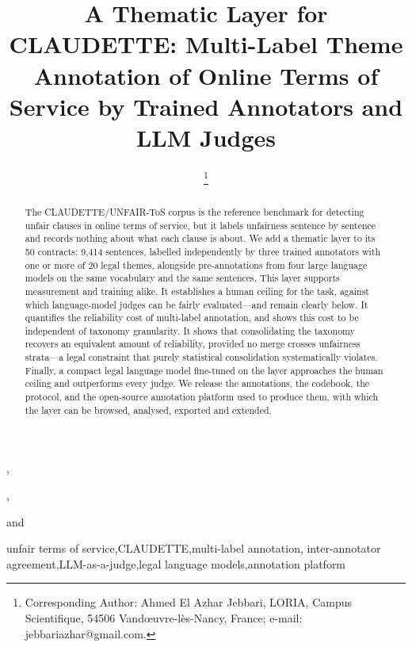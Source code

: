 \documentclass{IOS-Book-Article}
\newcommand{\corpus}{CLAUDETTE}
\begin{document}
\begin{frontmatter}
\title{A Thematic Layer for \corpus{}: Multi-Label Theme Annotation of Online Terms of Service by Trained Annotators and LLM Judges}
\runningtitle{A Thematic Layer for \corpus{}}
\author[A]{ %
\thanks{Corresponding Author: Ahmed El Azhar Jebbari, LORIA, Campus Scientifique, 54506 Vandœuvre-lès-Nancy, France; e-mail: jebbariazhar@gmail.com.}},
\author[A]{ },
\author[B]{ }
and
\author[C]{ }
\address[A]{LORIA, Université de Lorraine, CNRS, Inria, Nancy, France}
\address[B]{Juristiadata, France}
\address[C]{Faculty of Legal Sciences, Rabat, Morocco}

\begin{abstract}
The \corpus{}/UNFAIR-ToS corpus is the reference benchmark for detecting unfair clauses in online terms of service, but it labels unfairness sentence by sentence and records nothing about what each clause is about. We add a thematic layer to its 50 contracts: 9,414 sentences, labelled independently by three trained annotators with one or more of 20 legal themes, alongside pre-annotations from four large language models on the same vocabulary and the same sentences. This layer supports measurement and training alike. It establishes a human ceiling for the task, against which language-model judges can be fairly evaluated---and remain clearly below. It quantifies the reliability cost of multi-label annotation, and shows this cost to be independent of taxonomy granularity. It shows that consolidating the taxonomy recovers an equivalent amount of reliability, provided no merge crosses unfairness strata---a legal constraint that purely statistical consolidation systematically violates. Finally, a compact legal language model fine-tuned on the layer approaches the human ceiling and outperforms every judge. We release the annotations, the codebook, the protocol, and the open-source annotation platform used to produce them, with which the layer can be browsed, analysed, exported and extended.
\end{abstract}

\begin{keyword}
unfair terms of service\sep \corpus{}\sep multi-label annotation\sep
inter-annotator agreement\sep LLM-as-a-judge\sep legal language models\sep annotation platform
\end{keyword}
\end{frontmatter}
\end{document}

